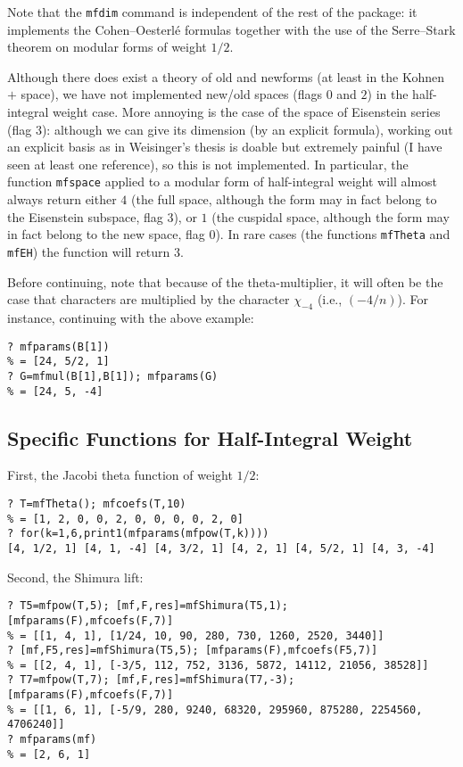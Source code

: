 \documentclass[11pt]{article}
\def\kbd#1{{\tt #1}}
\begin{document}
Note that the \kbd{mfdim} command is independent of the rest of the
package: it implements the Cohen--Oesterl\'e formulas together with the
use of the Serre--Stark theorem on modular forms of weight $1/2$.

\smallskip

Although there does exist a theory of old and newforms (at least in the
Kohnen $+$ space), we have not implemented new/old spaces (flags $0$ and $2$)
in the half-integral weight case. More annoying is the case of the space of
Eisenstein series (flag $3$): although we can give its dimension
(by an explicit formula), working out an explicit basis as in Weisinger's
thesis is doable but extremely painful (I have seen at least one reference),
so this is not implemented. In particular, the function \kbd{mfspace}
applied to a modular form of half-integral weight will almost always
return either $4$ (the full space, although the form may in fact belong
to the Eisenstein subspace, flag $3$), or $1$ (the cuspidal space, although
the form may in fact belong to the new space, flag $0$). In rare cases
(the functions \kbd{mfTheta} and \kbd{mfEH}) the function will return $3$.

\smallskip

Before continuing, note that because of the theta-multiplier, it will often
be the case that characters are multiplied by the character $\chi_{-4}$
(i.e., $(-4/n)$). For instance, continuing with the above example:

\begin{verbatim}
? mfparams(B[1])
% = [24, 5/2, 1]
? G=mfmul(B[1],B[1]); mfparams(G)
% = [24, 5, -4]
\end{verbatim}

\subsection{Specific Functions for Half-Integral Weight}

First, the Jacobi theta function of weight $1/2$:

\begin{verbatim}
? T=mfTheta(); mfcoefs(T,10)
% = [1, 2, 0, 0, 2, 0, 0, 0, 0, 2, 0]
? for(k=1,6,print1(mfparams(mfpow(T,k))))
[4, 1/2, 1] [4, 1, -4] [4, 3/2, 1] [4, 2, 1] [4, 5/2, 1] [4, 3, -4]
\end{verbatim}

Second, the Shimura lift:

\begin{verbatim}
? T5=mfpow(T,5); [mf,F,res]=mfShimura(T5,1); [mfparams(F),mfcoefs(F,7)]
% = [[1, 4, 1], [1/24, 10, 90, 280, 730, 1260, 2520, 3440]]
? [mf,F5,res]=mfShimura(T5,5); [mfparams(F),mfcoefs(F5,7)]
% = [[2, 4, 1], [-3/5, 112, 752, 3136, 5872, 14112, 21056, 38528]]
? T7=mfpow(T,7); [mf,F,res]=mfShimura(T7,-3); [mfparams(F),mfcoefs(F,7)]
% = [[1, 6, 1], [-5/9, 280, 9240, 68320, 295960, 875280, 2254560, 4706240]]
? mfparams(mf)
% = [2, 6, 1]
\end{verbatim}
\end{document}
